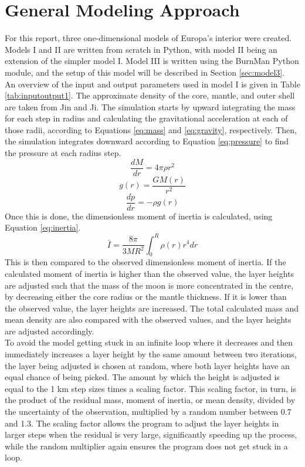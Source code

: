 \documentclass[twocolumn]{article}
\begin{document}
\section{General Modeling Approach}
For this report, three one-dimensional models of Europa's interior were created. Models I and II are written from scratch in Python, with model II being an extension of the simpler model I. Model III is written using the BurnMan Python module, and the setup of this model will be described in Section \ref{sec:model3}.\\
\indent An overview of the input and output parameters used in model I is given in Table \ref{tab:inputoutput1}. The approximate density of the core, mantle, and outer shell are taken from Jin and Ji\cite{jinInternalStructureModels2012}. The simulation starts by upward integrating the mass for each step in radius and calculating the gravitational acceleration at each of those radii, according to Equations \ref{eq:mass} and \ref{eq:gravity}, respectively. Then, the simulation integrates downward according to Equation \ref{eq:pressure} to find the pressure at each radius step.
\begin{equation}
	\label{eq:mass}
	\frac{dM}{dr} = 4\pi\rho r^2
\end{equation}
\begin{equation}
	\label{eq:gravity}
	g(r) = \frac{GM(r)}{r^2}
\end{equation}
\begin{equation}
	\label{eq:pressure}
	\frac{dp}{dr} = -\rho g(r)
\end{equation}
Once this is done, the dimensionless moment of inertia is calculated, using Equation \ref{eq:inertia}.
\begin{equation}
	\label{eq:inertia}
	\bar{I} = \frac{8\pi}{3MR^2}\int_{0}^{R}\rho(r)r^4dr
\end{equation}
This is then compared to the observed dimensionless moment of inertia. If the calculated moment of inertia is higher than the observed value, the layer heights are adjusted such that the mass of the moon is more concentrated in the centre, by decreasing either the core radius or the mantle thickness. If it is lower than the observed value, the layer heights are increased. The total calculated mass and mean density are also compared with the observed values, and the layer heights are adjusted accordingly.\\
To avoid the model getting stuck in an infinite loop where it decreases and then immediately increases a layer height by the same amount between two iterations, the layer being adjusted is chosen at random, where both layer heights have an equal chance of being picked. The amount by which the height is adjusted is equal to the 1 km step sizes times a scaling factor. This scaling factor, in turn, is the product of the residual mass, moment of inertia, or mean density, divided by the uncertainty of the observation, multiplied by a random number between 0.7 and 1.3. The scaling factor allows the program to adjust the layer heights in larger steps when the residual is very large, significantly speeding up the process, while the random multiplier again ensures the program does not get stuck in a loop.\\
\end{document}
